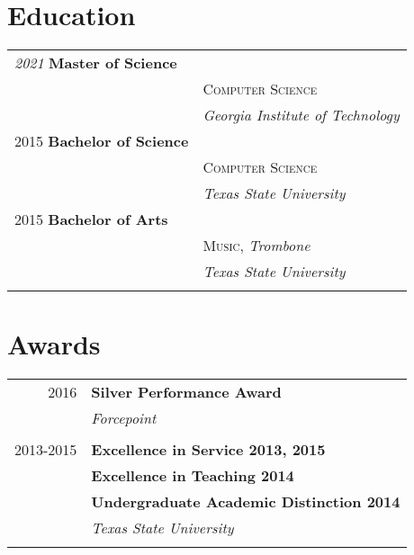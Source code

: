 \documentclass[10pt]{article} %
\begin{document}
\begin{minipage}[t]{0.44\textwidth}
\section{Education} 

\begin{tabular}{ll} %

\textit{2021} \textbf{Master of Science}\\
& \textsc{Computer Science}\\
& \textit{Georgia Institute of Technology}\\

2015 \textbf{Bachelor of Science} \\ 
& \textsc{Computer Science} \\ 
& \textit{Texas State University}\\

	 

2015 \textbf{Bachelor of Arts} \\ 
& \textsc{Music}, \textit{Trombone}\\ 
& \textit{Texas State University}\\ \\

\end{tabular}


\section{Awards} 

\begin{tabular}{rl}
2016     & \textbf{Silver Performance Award}\\
& \textit{Forcepoint}\\ \\

2013-2015     & \textbf{Excellence in Service 2013, 2015}\\
& \textbf{Excellence in Teaching 2014}\\
& \textbf{Undergraduate Academic Distinction 2014}\\
& \textit{Texas State University}\\\\


\end{tabular}
\end{minipage}
\end{document}
